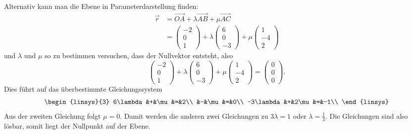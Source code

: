 \begin{loesung}
Alternativ kann man die Ebene in Parameterdarstellung finden:
\begin{align*}
\vec r&=\overrightarrow{OA}+\lambda \overrightarrow{AB}+\mu\overrightarrow{AC}\\
&=
\begin{pmatrix}
-2\\0\\1
\end{pmatrix}
+
\lambda
\begin{pmatrix}
6\\0\\-3
\end{pmatrix}
+
\mu
\begin{pmatrix}
1\\-4\\2
\end{pmatrix}
\end{align*}
und $\lambda$ und $\mu$ so zu bestimmen versuchen, dass
der Nullvektor entsteht, also
\[
\begin{pmatrix}
-2\\0\\1
\end{pmatrix}
+
\lambda
\begin{pmatrix}
6\\0\\-3
\end{pmatrix}
+
\mu
\begin{pmatrix}
1\\-4\\2
\end{pmatrix}
=
\begin{pmatrix}
0\\0\\0
\end{pmatrix}.
\]
Dies führt auf das überbestimmte Gleichungssystem
\[
\begin{linsys}{3}
6\lambda&+&\mu&=&2\\
&-&\mu&=&0\\
-3\lambda&+&2\mu&=&-1\\
\end{linsys}
\]
Aus der zweiten Gleichung folgt $\mu=0$. Damit werden die anderen
zwei Gleichungen zu $3\lambda=1$ oder $\lambda=\frac13$. Die Gleichungen
sind also lösbar, somit liegt der Nullpunkt auf der Ebene.


\end{loesung}
